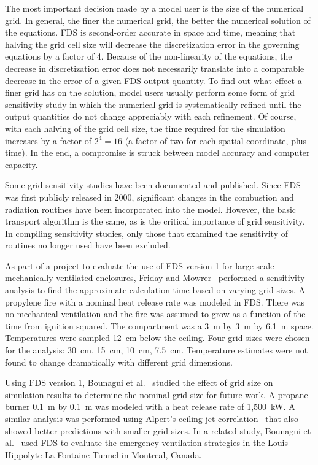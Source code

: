 \documentclass[11pt]{book}
\begin{document}
\label{gridsen}

The most  important decision made by a  model user is the  size of the numerical grid. In  general, the finer the numerical  grid, the better the
numerical solution of  the equations. FDS is second-order accurate in  space and  time,  meaning that  halving  the grid  cell size  will decrease
the discretization  error in  the governing  equations  by a factor  of 4.  Because  of  the non-linearity  of  the equations,  the decrease in
discretization error does not necessarily translate into a comparable decrease  in the error of  a given FDS  output quantity. To find out  what
effect a  finer grid has  on the solution,  model users usually  perform some  form of  grid  sensitivity study  in which  the numerical grid  is
systematically refined until  the output quantities do not change  appreciably with each refinement. Of  course, with each halving of  the grid cell
size,  the time required  for the simulation increases by  a factor of $2^4=16$  (a factor of two  for each spatial coordinate, plus  time). In  the
end, a  compromise is  struck between model accuracy and computer capacity.

Some   grid    sensitivity   studies   have    been   documented   and published. Since FDS was  first publicly released in 2000, significant changes
in  the   combustion  and   radiation  routines   have  been incorporated into the model. However, the basic transport algorithm is the  same, as  is
the  critical importance  of  grid sensitivity.  In compiling   sensitivity  studies,   only  those   that   examined  the sensitivity of routines no
longer used have been excluded.

As part of  a project to evaluate  the use of FDS version  1 for large scale   mechanically  ventilated   enclosures,  Friday and Mowrer~\cite{Friday:1}
performed a  sensitivity analysis to find  the approximate calculation time based on varying grid sizes. A propylene fire with a nominal heat release
rate was  modeled in FDS. There was  no mechanical ventilation and  the fire  was assumed  to grow  as a  function of  the  time from ignition
squared.  The  compartment  was   a  3~m  by  3~m  by  6.1~m space. Temperatures  were sampled 12~cm  below the ceiling.  Four grid sizes   were
chosen  for   the   analysis:   30~cm,  15~cm,   10~cm, 7.5~cm. Temperature  estimates were  not found to  change dramatically with different grid
dimensions.

Using FDS  version 1, Bounagui et al.~\cite{Bounagui:1} studied the effect of grid size on simulation results to determine the nominal grid
size for future work. A propane burner 0.1~m by 0.1~m was modeled with  a heat  release rate  of  1,500~kW.   A similar analysis was performed using
Alpert's ceiling  jet correlation~\cite{SFPE:Alpert}  that also showed better  predictions   with smaller grid sizes.  In a  related study,  Bounagui et al.~\cite{Bounagui:2} used  FDS to  evaluate  the emergency  ventilation  strategies in  the Louis-Hippolyte-La Fontaine Tunnel in
Montreal, Canada.
\end{document}
